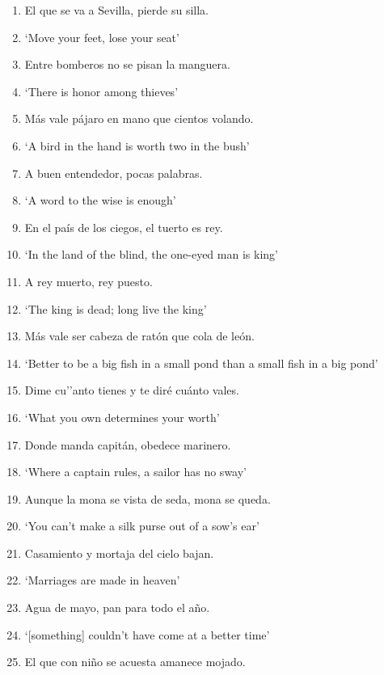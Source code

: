 \documentclass[output=paper,colorlinks,citecolor=brown,draftmode]{langscibook}
\begin{document}


\label{app:proverbs}



\begin{enumerate}[topsep=0pt,itemsep=-1ex,partopsep=1ex,parsep=1ex]
	\item El que se va a Sevilla, pierde su silla.
        \item[] ‘Move your feet, lose your seat’
	\item Entre bomberos no se pisan la manguera.
        \item[] ‘There is honor among thieves’
	\item M{\'a}s vale p{\'a}jaro en mano que cientos volando.
        \item[] ‘A bird in the hand is worth two in the bush’
	\item A buen entendedor, pocas palabras.
        \item[] ‘A word to the wise is enough’
	\item En el pa{\'i}s de los ciegos, el tuerto es rey.
 \item[] ‘In the land of the blind, the one-eyed man is king’
	\item A rey muerto, rey puesto.
 \item[] ‘The king is dead; long live the king’
	\item M{\'a}s vale ser cabeza de rat{\'o}n que cola de le{\'o}n.
 \item[] ‘Better to be a big fish in a small pond than a small fish in a big pond’
	\item Dime cu'’anto tienes y te dir\'e cu\'anto vales.
\item[]  ‘What you own determines your worth’
\item Donde manda capit\'an, obedece marinero.
\item[]‘Where a captain rules, a sailor has no sway’
\item Aunque la mona se vista de seda, mona se queda.
\item[]  ‘You can't make a silk purse out of a sow's ear’
\item Casamiento y mortaja del cielo bajan.
\item[]  ‘Marriages are made in heaven’
\item Agua de mayo, pan para todo el a\~no.
\item[]  ‘[something] couldn’t have come at a better time’
\item El que con ni\~no se acuesta amanece mojado.

\end{enumerate}
\end{document}

